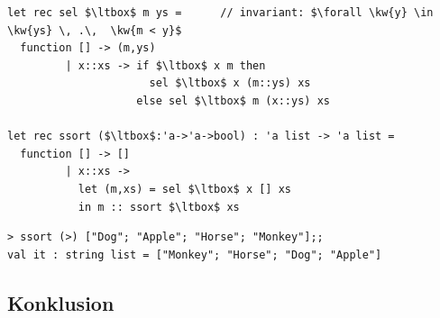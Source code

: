 \documentclass[rgb]{beamer}
\begin{document}
\begin{frame}[fragile]
\begin{footnotesize}


  \vspace{2ex}

\newcommand{\ltbox}{\fbox{\texttt{lt}}}
\begin{lstlisting}[numbers=none,frame=none,mathescape]
let rec sel $\ltbox$ m ys =      // invariant: $\forall \kw{y} \in \kw{ys} \, .\,  \kw{m < y}$
  function [] -> (m,ys)
         | x::xs -> if $\ltbox$ x m then
                      sel $\ltbox$ x (m::ys) xs
                    else sel $\ltbox$ m (x::ys) xs

let rec ssort ($\ltbox$:'a->'a->bool) : 'a list -> 'a list =
  function [] -> []
         | x::xs ->
           let (m,xs) = sel $\ltbox$ x [] xs
           in m :: ssort $\ltbox$ xs
\end{lstlisting}

\begin{lstlisting}[numbers=none,frame=none,mathescape]
> ssort (>) ["Dog"; "Apple"; "Horse"; "Monkey"];;
val it : string list = ["Monkey"; "Horse"; "Dog"; "Apple"]
\end{lstlisting}

\end{footnotesize}
\end{frame}

\subsection*{Konklusion}
\begin{frame}[fragile]

  \vspace{3mm}
  \tableofcontents
\end{frame}
\end{document}
